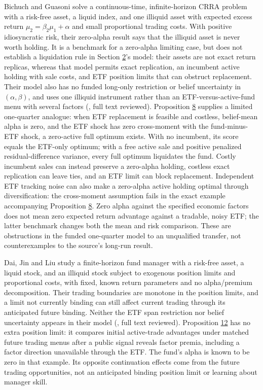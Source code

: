\documentclass[11pt]{article}
\begin{document}
Bichuch and Guasoni solve a continuous-time, infinite-horizon CRRA problem with a risk-free
asset, a liquid index, and one illiquid asset with expected excess return
\(\mu_2=\beta_2\mu_1+\alpha\) and small proportional trading costs. With positive
idiosyncratic risk, their zero-alpha result says that the illiquid asset is never worth
holding. It is a benchmark for a zero-alpha limiting case, but does not establish a
liquidation rule in Section \hyperref[sec:2]{2}'s model: their assets are not exact return replicas,
whereas that model permits exact
replication, an incumbent active holding with sale costs, and ETF position limits that
can obstruct replacement. Their model also has no funded long-only restriction or
belief uncertainty in \((\alpha,\beta)\), and uses one illiquid instrument rather than an
ETF-versus-active-fund menu with several factors (\cite{bichuch2014investing}, full text
reviewed). Proposition \hyperref[res:Proposition-8]{8} supplies a limited one-quarter analogue: when ETF
replacement is feasible and costless, belief-mean alpha is zero, and
the ETF shock has zero cross-moment with the fund-minus-ETF shock, a
zero-active full optimum exists. With no incumbent, its score equals
the ETF-only optimum; with a free active sale and positive penalized
residual-difference variance, every full optimum liquidates the fund.
Costly incumbent sales can instead preserve a zero-alpha holding,
costless exact replication can leave ties, and an ETF limit can block
replacement. Independent ETF tracking noise can also make a
zero-alpha active holding optimal through diversification: the
cross-moment assumption fails in the exact example accompanying
Proposition \hyperref[res:Proposition-8]{8}. Zero alpha against the specified economic factors
does not mean zero expected return advantage against a tradable,
noisy ETF;
the latter benchmark changes both the mean and risk comparison.
These are obstructions in the funded one-quarter model to an
unqualified transfer,
not counterexamples to the source's long-run result.

Dai, Jin and Liu study a finite-horizon fund manager with a risk-free asset, a liquid
stock, and an illiquid stock subject to exogenous position limits and proportional costs,
with fixed, known return parameters and no alpha/premium decomposition. Their trading
boundaries are monotone in the position limits, and a limit not currently binding can
still affect current trading through its anticipated future binding. Neither the ETF
span restriction nor belief uncertainty appears in their model (\cite{dai2011illiquidity},
full text reviewed). Proposition \hyperref[res:Proposition-12]{12} has no extra position limit:
it compares initial active-trade advantages under matched future
trading menus after a public signal reveals factor premia, including
a factor direction unavailable through the ETF. The fund's alpha is
known to be zero in that example.
Its opposite continuation effects come from the future trading
opportunities, not an anticipated binding position limit or
learning about manager skill.
\end{document}
